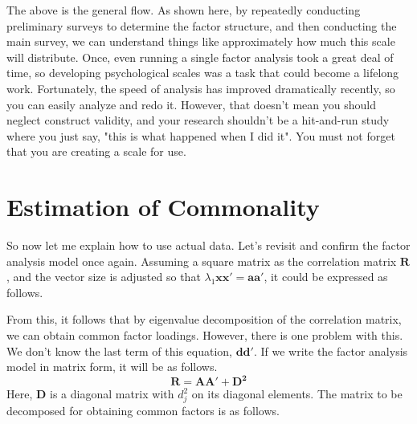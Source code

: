 \documentclass{ltjsbook}
\begin{document}
The above is the general flow. As shown here, by repeatedly conducting preliminary surveys to determine the factor structure, and then conducting the main survey, we can understand things like approximately how much this scale will distribute.
Once, even running a single factor analysis took a great deal of time, so developing psychological scales was a task that could become a lifelong work. Fortunately, the speed of analysis has improved dramatically recently, so you can easily analyze and redo it. However, that doesn't mean you should neglect construct validity, and your research shouldn't be a hit-and-run study where you just say, "this is what happened when I did it". You must not forget that you are creating a scale for use.

\section{Estimation of Commonality}

So now let me explain how to use actual data.
Let's revisit and confirm the factor analysis model once again.
Assuming a square matrix as the correlation matrix $\bm{R}$, and the vector size is adjusted so that $\lambda_1 \bm{xx'} = \bm{aa'}$, it could be expressed as follows.

From this, it follows that by eigenvalue decomposition of the correlation matrix, we can obtain common factor loadings. However, there is one problem with this. We don't know the last term of this equation, $\bm{d} \bm{d}'$. If we write the factor analysis model in matrix form, it will be as follows.
\[
	\bm{R} = \bm{AA'}+\bm{D^2}
\]
Here, $\bm{D}$ is a diagonal matrix with $d_j^2$ on its diagonal elements. The matrix to be decomposed for obtaining common factors is as follows.
\end{document}
